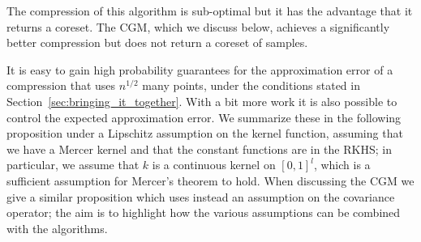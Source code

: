 \documentclass[AHL,Unicode,longabstracts,published]{cedram}
\theoremstyle{remark}
\begin{document}
The compression of this algorithm is sub-optimal but it has the advantage that it returns a coreset. The CGM, which we discuss below, achieves a significantly better compression but does not return a coreset of samples.


It is easy to gain high probability guarantees for the approximation error of a compression that uses $n^{1/2}$ many points, under the conditions stated in Section~\ref{sec:bringing_it_together}. With a bit more work it is also possible to control the expected approximation error. We summarize these in the following proposition under a Lipschitz assumption on the kernel function, assuming that we have a Mercer kernel and that the constant functions are in the RKHS; in particular, we assume that $k$ is a continuous kernel on $[0,1]^l$, which is a sufficient assumption for Mercer's theorem to hold. When discussing the CGM we give a similar proposition which uses instead an assumption on the covariance operator; the aim is to highlight how the various assumptions can be combined with the algorithms.
\end{document}
